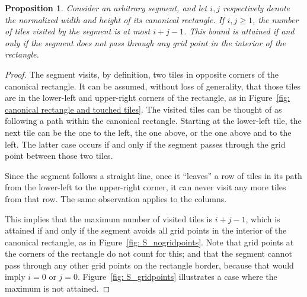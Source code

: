 \documentclass[12pt, a4paper]{article}
\newtheorem{proposition}{Proposition}%
\begin{document}
\begin{proposition}
\label{prop: i+j-1}
Consider an arbitrary segment, and let $i, j$ respectively denote the normalized width and height of its canonical rectangle. If $i, j \geq 1$, the number of tiles visited by the segment is at most $i+j-1$. This bound is attained if and only if the segment does not pass through any grid point in the interior of the rectangle.
\end{proposition}

\begin{proof}
The segment visits, by definition, two tiles in opposite corners of the canonical rectangle. It can be assumed, without loss of generality, that those tiles are in the lower-left and upper-right corners of the rectangle, as in Figure~\ref{fig: canonical rectangle and touched tiles}. The visited tiles can be thought of as following a path within the canonical rectangle. Starting at the lower-left tile, the next tile can be the one to the left, the one above, or the one above and to the left. The latter case occurs if and only if the segment passes through the grid point between those two tiles.

Since the segment follows a straight line, once it ``leaves'' a row of tiles in its path from the lower-left to the upper-right corner, it can never visit any more tiles from that row. The same observation applies to the columns.

This implies that the maximum number of visited tiles is $i+j-1$, which is attained if and only if the segment avoids all grid points in the interior of the canonical rectangle, as in Figure~\ref{fig: S_nogridpoints}. Note that grid points at the corners of the rectangle do not count for this; and that the segment cannot pass through any other grid points on the rectangle border, because that would imply $i=0$ or $j=0$. Figure~\ref{fig: S_gridpoints} illustrates a case where the maximum is not attained.
\end{proof}
\end{document}
